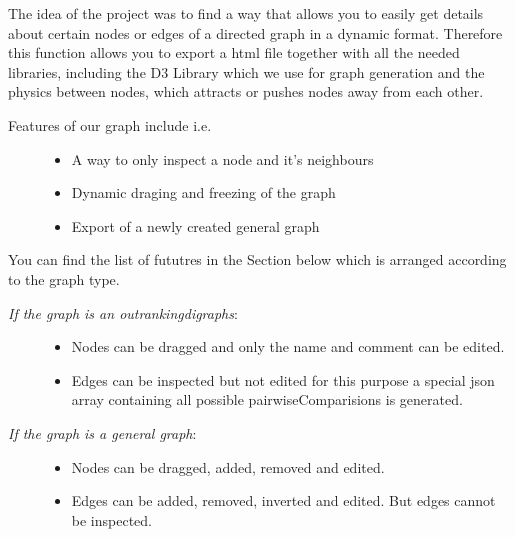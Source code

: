 \documentclass[letterpaper,10pt,english]{sphinxmanual}
\begin{document}
\begin{fulllineitems}
\begin{fulllineitems}
\begin{description}
\begin{itemize}
\end{itemize}

\end{description}

The idea of the project was to find a way that allows you to easily get details about certain nodes or edges of a directed graph in a dynamic format. 
Therefore this function allows you to export a html file together with all the needed libraries, including the 
D3 Library which we use for graph generation and the physics between nodes, which attracts or pushes nodes away from each other.
\begin{description}
\item[{Features of our graph include i.e.}] \leavevmode{[}{]}\begin{itemize}
\item {} 
A way to only inspect a node and it's neighbours

\item {} 
Dynamic draging and freezing of the graph

\item {} 
Export of a newly created general graph

\end{itemize}

\end{description}

You can find the list of fututres in the Section below which is arranged according to the graph type.
\begin{description}
\item[{\emph{If the graph is an outrankingdigraphs}:}] \leavevmode\begin{itemize}
\item {} 
Nodes can be dragged and only the name and comment can be edited.

\item {} 
Edges can be inspected but not edited for this purpose a special json array containing all possible pairwiseComparisions is generated.

\end{itemize}

\item[{\emph{If the graph is a general graph}:}] \leavevmode\begin{itemize}
\item {} 
Nodes can be dragged, added, removed and edited.

\item {} 
Edges can be added, removed, inverted and edited. But edges cannot be inspected.


\end{itemize}
\end{description}
\end{fulllineitems}
\end{fulllineitems}
\end{document}
